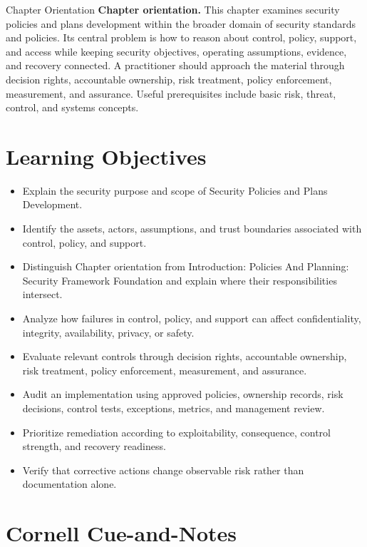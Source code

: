 \documentclass[11pt,letterpaper]{article}
\title{\CornellDocumentTitle}
\author{}
\date{}
\begin{document}
\maketitle
\begin{CornellOverviewBox}{Chapter Orientation}
\textbf{Chapter orientation.} This chapter examines security policies and plans development within the broader domain of security standards and policies. Its central problem is how to reason about control, policy, support, and access while keeping security objectives, operating assumptions, evidence, and recovery connected. A practitioner should approach the material through decision rights, accountable ownership, risk treatment, policy enforcement, measurement, and assurance. Useful prerequisites include basic risk, threat, control, and systems concepts.
\end{CornellOverviewBox}
\section*{Learning Objectives}
\begin{itemize}
\item Explain the security purpose and scope of Security Policies and Plans Development.
\item Identify the assets, actors, assumptions, and trust boundaries associated with control, policy, and support.
\item Distinguish Chapter orientation from Introduction: Policies And Planning: Security Framework Foundation and explain where their responsibilities intersect.
\item Analyze how failures in control, policy, and support can affect confidentiality, integrity, availability, privacy, or safety.
\item Evaluate relevant controls through decision rights, accountable ownership, risk treatment, policy enforcement, measurement, and assurance.
\item Audit an implementation using approved policies, ownership records, risk decisions, control tests, exceptions, metrics, and management review.
\item Prioritize remediation according to exploitability, consequence, control strength, and recovery readiness.
\item Verify that corrective actions change observable risk rather than documentation alone.
\end{itemize}
\section*{Cornell Cue-and-Notes}
\end{document}
